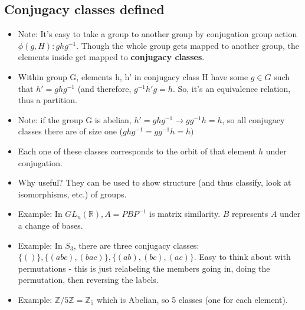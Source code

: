 \documentclass[11pt, oneside]{article}   	%
\begin{document}
\subsection{Conjugacy classes defined}
\begin{itemize}
\item Note: It's easy to take a group to another group by conjugation group action $\phi(g, H): ghg^{-1}$.  Though the whole group gets mapped to another group, the elements inside get mapped to \textbf{conjugacy classes}.
\item Within group G, elements h, h' in conjugacy class H have some $g \in G$ such that $h' = ghg^{-1}$ (and therefore,  $g^{-1}h'g = h$.  So, it's an equivalence relation, thus a partition.
\item Note: if the group G is abelian, $h' = ghg^{-1} \rightarrow gg^{-1} h = h$, so all conjugacy classes there are of size one ($ghg^{-1} = gg^{-1}h = h)$
\item Each one of these classes corresponds to the orbit of that element $h$ under conjugation.  
\item Why useful?  They can be used to show structure (and thus classify, look at isomorphisms, etc.) of groups.
\item Example: In $GL_n(\mathbb{R}), A = PBP^{-1}$ is matrix similarity.  $B$ represents $A$ under a change of bases.
\item Example: In $S_3$, there are three conjugacy classes: $\{()\}, \{(abc), (bac)\}, \{(ab), (bc), (ac)\}$.  Easy to think about with permutations - this is just relabeling the members going in, doing the permutation, then reversing the labels.
\item Example: $\mathbb{Z} / 5\mathbb{Z} = \mathbb{Z}_5$ which is Abelian, so 5 classes (one for each element).
\end{itemize}
\end{document}
